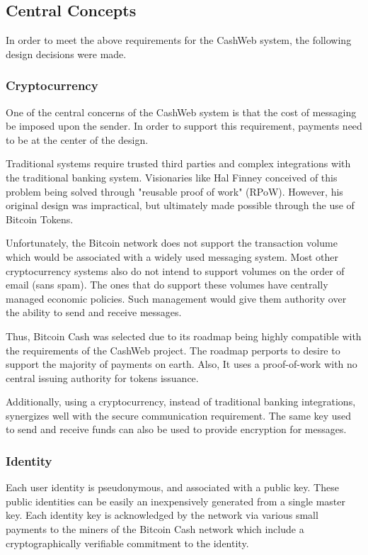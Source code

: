 \documentclass{article}
\theoremstyle{definition}
\begin{document}
\subsection{Central Concepts}

In order to meet the above requirements for the CashWeb system, the following design decisions were made.

\subsubsection{Cryptocurrency}

One of the central concerns of the CashWeb system is that the cost of messaging be imposed upon the sender. In order to support this requirement, payments need to be at the center of the design.

Traditional systems require trusted third parties and complex integrations with the traditional banking system. Visionaries like Hal Finney conceived of this problem being solved through "reusable proof of work" (RPoW). However, his original design was impractical, but ultimately made possible through the use of Bitcoin Tokens.

Unfortunately, the Bitcoin network does not support the transaction volume which would be associated with a widely used messaging system.  Most other cryptocurrency systems also do not intend to support volumes on the order of email (sans spam). The ones that do support these volumes have centrally managed economic policies. Such management would give them authority over the ability to send and receive messages.

Thus,  Bitcoin Cash was selected due to its roadmap being highly compatible with the requirements of the CashWeb project. The roadmap perports to desire to support the majority of payments on earth. Also, It uses a proof-of-work with no central issuing authority for tokens issuance.

Additionally, using a cryptocurrency, instead of traditional banking integrations, synergizes well with the secure communication requirement. The same key used to send and receive funds can also be used to provide encryption for messages.

\subsubsection{Identity}

Each user identity is pseudonymous, and associated with a public key.  These public identities can be easily an inexpensively generated from a single master key. Each identity key is acknowledged by the network via various small payments to the miners of the Bitcoin Cash network which include a cryptographically verifiable commitment to the identity.
\end{document}
